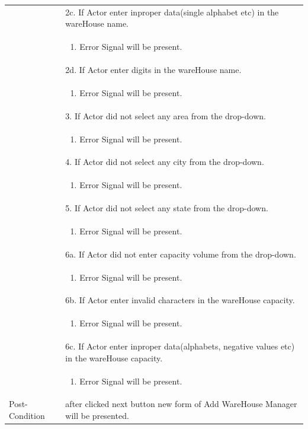 \documentclass[12pt,a4paper]{report}
\begin{document}
\begin{tabular}{ | m{3cm} | m{12cm}| } \hline 
& 2c. If Actor enter inproper data(single alphabet etc) in the wareHouse name. \\
& \begin{enumerate}
		\item Error Signal will be present.
	\end{enumerate}
\\ 
& 2d. If Actor enter digits in the wareHouse name. \\
& \begin{enumerate}
		\item Error Signal will be present.
	\end{enumerate}
\\ 

& 3. If Actor did not select any area from the drop-down. \\
& \begin{enumerate}
		\item Error Signal will be present.
	\end{enumerate}
\\ 

&  4. If Actor did not select any city from the drop-down. \\
& \begin{enumerate}
		\item Error Signal will be present.
	\end{enumerate}
\\ 
&  5. If Actor did not select any state from the drop-down. \\
& \begin{enumerate}
		\item Error Signal will be present.
	\end{enumerate}
\\
&  6a. If Actor did not enter capacity volume  from the drop-down. \\
& \begin{enumerate}
		\item Error Signal will be present.
	\end{enumerate}
\\

& 6b. If Actor enter invalid characters in the wareHouse capacity. \\
& \begin{enumerate}
		\item Error Signal will be present.
	\end{enumerate}
\\ 
& 6c. If Actor enter inproper data(alphabets, negative values etc) in the wareHouse capacity. \\
& \begin{enumerate}
		\item Error Signal will be present.
	\end{enumerate}


\\ \hline 


Post-Condition &  after clicked next button new form of Add WareHouse Manager will be presented.  \\ \hline

\end{tabular}
\end{document}
